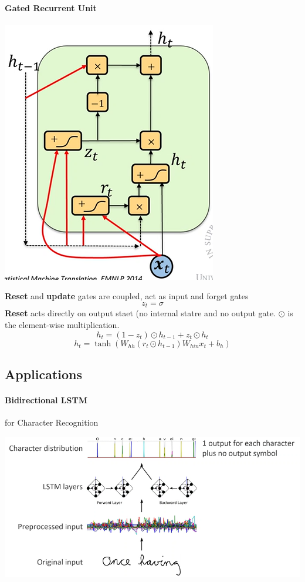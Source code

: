 \documentclass[10pt]{report}
\begin{document}
\paragraph{Gated Recurrent Unit}\begin{center}
	\includegraphics[scale=0.5]{98.png}
\end{center}
\textbf{Reset} and \textbf{update} gates are coupled, act as input and forget gates 
$$z_t =\sigma$$ %
\textbf{Reset} acts directly on output staet (no internal statre and no output gate. $\odot$ is the element-wise multiplication.
$$h_t = (1 - z_t)\odot h_{t-1} + z_t\odot h_t$$
$$h_t = \tanh(W_{hh}(r_t\odot h_{t-1}) W_{hin}x_t + b_h)$$
\subsection{Applications}
\paragraph{Bidirectional LSTM} for Character Recognition
\begin{center}
	\includegraphics[scale=0.5]{99.png}
\end{center}
\end{document}
